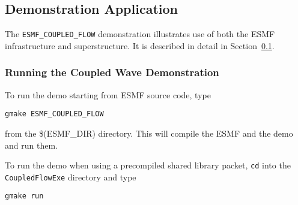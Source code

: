 \subsection{Demonstration Application}
\label{sec:demo}

The {\tt ESMF\_COUPLED\_FLOW} demonstration illustrates use of both the
ESMF infrastructure and superstructure.  It is described in detail in 
Section~\ref{sec:demo}.

\subsubsection{Running the Coupled Wave Demonstration}

To run the demo starting from ESMF source code, type 

\begin{verbatim}
gmake ESMF_COUPLED_FLOW
\end{verbatim}

from the \$(ESMF\_DIR) directory.  This will compile the 
ESMF and the demo and run them.

To run the demo when using a precompiled shared
library packet, {\tt cd} into the {\tt CoupledFlowExe}
directory and type

\begin{verbatim}
gmake run
\end{verbatim}































